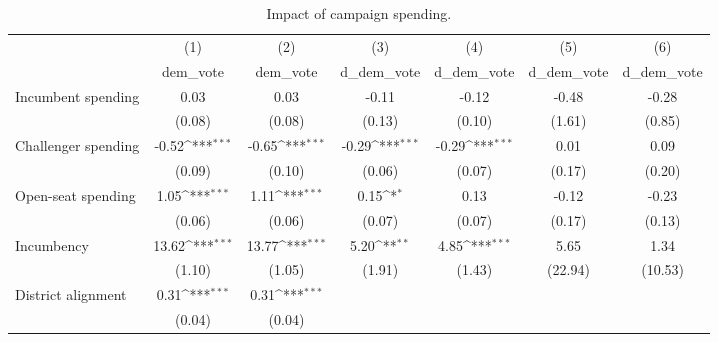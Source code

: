\begin{table}[htbp]\centering
\def\sym#1{\ifmmode^{#1}\else\(^{#1}\)\fi}
\caption{Impact of campaign spending. \label{table:reg1}}
\begin{tabular}{l*{6}{c}}
\toprule
                    &\multicolumn{1}{c}{(1)}&\multicolumn{1}{c}{(2)}&\multicolumn{1}{c}{(3)}&\multicolumn{1}{c}{(4)}&\multicolumn{1}{c}{(5)}&\multicolumn{1}{c}{(6)}\\
                    &\multicolumn{1}{c}{dem\_vote}&\multicolumn{1}{c}{dem\_vote}&\multicolumn{1}{c}{d\_dem\_vote}&\multicolumn{1}{c}{d\_dem\_vote}&\multicolumn{1}{c}{d\_dem\_vote}&\multicolumn{1}{c}{d\_dem\_vote}\\
\midrule
Incumbent spending  &        0.03         &        0.03         &       -0.11         &       -0.12         &       -0.48         &       -0.28         \\
                    &      (0.08)         &      (0.08)         &      (0.13)         &      (0.10)         &      (1.61)         &      (0.85)         \\
\addlinespace
Challenger spending &       -0.52\sym{***}&       -0.65\sym{***}&       -0.29\sym{***}&       -0.29\sym{***}&        0.01         &        0.09         \\
                    &      (0.09)         &      (0.10)         &      (0.06)         &      (0.07)         &      (0.17)         &      (0.20)         \\
\addlinespace
Open-seat spending  &        1.05\sym{***}&        1.11\sym{***}&        0.15\sym{*}  &        0.13         &       -0.12         &       -0.23         \\
                    &      (0.06)         &      (0.06)         &      (0.07)         &      (0.07)         &      (0.17)         &      (0.13)         \\
\addlinespace
Incumbency          &       13.62\sym{***}&       13.77\sym{***}&        5.20\sym{**} &        4.85\sym{***}&        5.65         &        1.34         \\
                    &      (1.10)         &      (1.05)         &      (1.91)         &      (1.43)         &     (22.94)         &     (10.53)         \\
\addlinespace
District alignment  &        0.31\sym{***}&        0.31\sym{***}&                     &                     &                     &                     \\
                    &      (0.04)         &      (0.04)         &                     &                     &                     &                     \\

\end{tabular}
\end{table}
